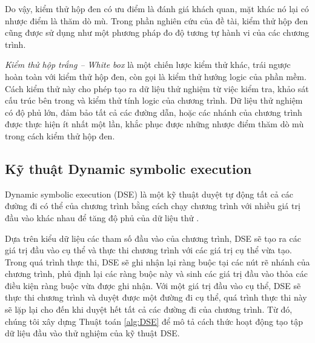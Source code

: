 Do vậy, kiểm thử hộp đen có ưu điểm là đánh giá khách quan, mặt khác
nó lại có nhược điểm là thăm dò mù. Trong phần nghiên cứu của đề tài,
kiểm thử hộp đen cũng được sử dụng như một phương pháp đo độ tương tự
hành vi của các chương trình.
		
\emph{Kiểm thử hộp trắng – White box} là một chiến lược kiểm thử khác,
trái ngược hoàn toàn với kiểm thử hộp đen, còn gọi là kiểm thử hướng
logic của phần mềm. Cách kiểm thử này cho phép tạo ra dữ liệu thử
nghiệm từ việc kiểm tra, khảo sát cấu trúc bên trong và kiểm thử tính
logic của chương trình. Dữ liệu thử nghiệm có độ phủ lớn, đảm bảo tất
cả các đường dẫn, hoặc các nhánh của chương trình được thực hiện ít
nhất một lần, khắc phục được những nhược điểm thăm dò mù trong cách
kiểm thử hộp đen.			

\subsection{Kỹ thuật Dynamic symbolic execution}
\label{sec:dse}

Dynamic symbolic execution (DSE) là một kỹ thuật duyệt tự động tất cả các đường đi có thể của chương trình bằng cách chạy chương trình với nhiều giá trị đầu vào khác nhau để tăng độ phủ của dữ liệu thử \cite{xie2009fitness}.

Dựa trên kiểu dữ liệu các tham số đầu vào của chương trình, DSE sẽ tạo ra các giá trị đầu vào cụ thể và thực thi chương trình với các giá trị cụ thể vừa tạo. Trong quá trình thực thi, DSE sẽ ghi nhận lại ràng buộc tại các nút rẽ nhánh của chương trình, phủ định lại các ràng buộc này và sinh các giá trị đầu vào thỏa các điều kiện ràng buộc vừa được ghi nhận. Với một giá trị đầu vào cụ thể, DSE sẽ thực thi chương trình và duyệt được một đường đi cụ thể, quá trình thực thi này sẽ lặp lại cho đến khi duyệt hết tất cả các đường đi của chương trình. Từ đó, chúng tôi xây dựng Thuật toán \ref{alg:DSE} để mô tả cách thức hoạt động tạo tập dữ liệu đầu vào thử nghiệm của kỹ thuật DSE.

